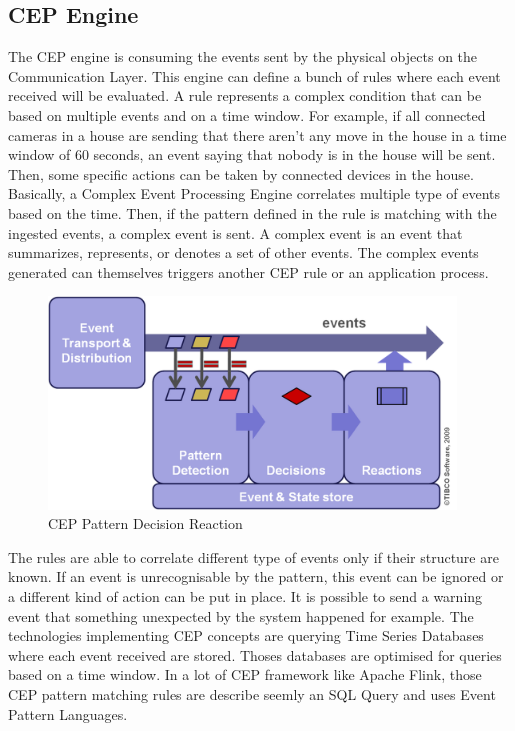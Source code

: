 \documentclass[11pt]{article}
\begin{document}
\subsection{CEP Engine} \label{cep-engine}

The CEP engine is consuming the events sent by the physical objects on the Communication Layer. This engine can define a bunch of rules where each event received will be evaluated. A rule represents a complex condition that can be based on multiple events and on a time window. For example, if all connected cameras in a house are sending that there aren't any move in the house in a time window of 60 seconds, an event saying that nobody is in the house will be sent. Then, some specific actions can be taken by connected devices in the house. Basically, a Complex Event Processing Engine correlates multiple type of events based on the time. Then, if the pattern defined in the rule is matching with the ingested events, a complex event is sent. A complex event is an event that summarizes, represents, or denotes a set of other events\cite{glossary}. The complex events generated can themselves triggers another CEP rule or an application process.
\newline
\begin{figure}[h]
	\includegraphics[width=\textwidth,height=160pt]{assets/cep-pattern-decision-reaction.png} 
	\caption{CEP Pattern Decision Reaction}
	\label{fig:cep-pattern-decision-reaction}
\end{figure}

The rules are able to correlate different type of events only if their structure are known. If an event is unrecognisable by the pattern, this event can be ignored or a different kind of action can be put in place. It is possible to send a warning event that something unexpected by the system happened for example. 
\newline
\newline
The technologies implementing CEP concepts are querying Time Series Databases where each event received are stored. Thoses databases are optimised for queries based on a time window. In a lot of CEP framework like Apache Flink, those CEP pattern matching rules are describe seemly an SQL Query and uses Event Pattern Languages. 
\end{document}

